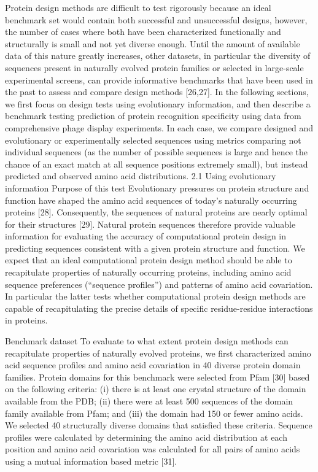 Protein design methods are difficult to test rigorously because an ideal benchmark set would contain both successful and unsuccessful designs, however, the number of cases where both have been characterized functionally and structurally is small and not yet diverse enough. Until the amount of available data of this nature greatly increases, other datasets, in particular the diversity of sequences present in naturally evolved protein families or selected in large-scale experimental screens, can provide informative benchmarks that have been used in the past to assess and compare design methods
[26,27]. In the following sections, we first focus on design tests using evolutionary information, and then describe a benchmark testing prediction of protein recognition specificity using data from comprehensive phage display experiments. In each case, we compare designed and evolutionary or experimentally selected sequences using metrics comparing not individual sequences (as the number of possible sequences is large and hence the chance of an exact match at all sequence positions extremely small), but instead predicted and observed amino acid distributions.
2.1 Using evolutionary information
Purpose of this test
Evolutionary pressures on protein structure and function have shaped the amino acid sequences of today's naturally occurring proteins [28]. Consequently, the sequences of natural proteins are nearly optimal for their structures [29]. Natural protein sequences therefore provide valuable information for evaluating the accuracy of computational protein design in predicting sequences consistent with a given protein structure and function. We expect that an ideal computational protein design method should be able to recapitulate properties of naturally occurring proteins, including amino acid sequence preferences (“sequence profiles”) and patterns of amino acid covariation. In particular the latter tests whether computational protein design methods are capable of recapitulating the precise details of specific residue-residue interactions in proteins.

Benchmark dataset
To evaluate to what extent protein design methods can recapitulate properties of naturally evolved proteins, we first characterized amino acid sequence profiles and amino acid covariation in 40 diverse protein domain families. Protein domains for this benchmark were selected from Pfam [30] based on the following criteria: (i) there is at least one crystal structure of the domain available from the PDB; (ii) there were at least 500 sequences of the domain family available from Pfam; and (iii) the domain had 150 or fewer amino acids. We selected 40 structurally diverse domains that satisfied these criteria. Sequence profiles were calculated by determining the amino acid distribution at each position and amino acid covariation was calculated for all pairs of amino acids using a mutual information based metric [31].

